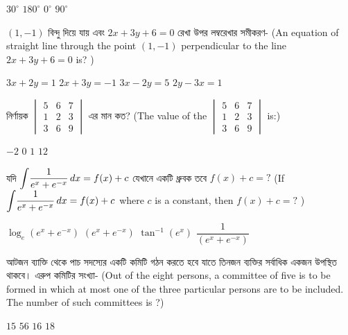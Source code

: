 \documentclass[addpoints]{exam}
\begin{document}
\begin{questions}
\begin{oneparchoices}
\choice  $ 30^{\circ} $
\choice  $ 180^{\circ} $
\choice  $ 0^{\circ} $
\choice  $ 90^{\circ} $
\end{oneparchoices}

\question $ (1,-1) $ বিন্দু দিয়ে যায় এবং $ 2x+3y+6=0 $ রেখা উপর লম্বরেখার সমীকরণ- (An equation of straight line through the point $ (1,-1) $ perpendicular to the line $ 2x+3y+6=0 $ is? )

\begin{oneparchoices}
\choice $ 3x+2y=1 $
\choice $ 2x+3y=-1 $ 
\choice $ 3x-2y=5 $
\choice $ 2y-3x=1 $
\end{oneparchoices}

\question  নির্ণায়ক $ \begin{vmatrix}
5 & 6 & 7\\
1 & 2 & 3\\
3 & 6 & 9
\end{vmatrix} $ এর মান কত? (The value of the $ \begin{vmatrix}
5 & 6 & 7\\
1 & 2 & 3\\
3 & 6 & 9
\end{vmatrix} $ is:)

\begin{oneparchoices}
\choice $ -2 $
\choice $ 0 $
\choice $ 1 $
\choice $ 12 $
\end{oneparchoices}


\question যদি $ \mathlarger{\int}\dfrac{1}{e^{x}+e^{-x}}\, dx =f(x) + c $  যেখানে একটি ধ্রুবক তবে $ f(x)+c = ?$ (If $ \mathlarger{\int}\dfrac{1}{e^{x}+e^{-x}}\, dx =f(x) + c $ where $ c $ is a constant, then $ f(x)+c =? $ )


\begin{oneparchoices}
\choice  $ \log_{e}(e^{x}+e^{-x}) $
\choice  $ (e^{x}+e^{-x}) $
\choice  $ \tan^{-1}(e^{x}) $
\choice  $ \dfrac{1}{(e^{x}+e^{-x})} $
\end{oneparchoices}


\question  আটজন ব্যাক্তি থেকে পাচ সদস্যের একটি কমিটি গঠন করতে হবে যাতে তিনজন ব্যক্তির সর্বাধিক একজন উপস্থিত থাকবে। এরুপ কমিটির সংখ্যা- (Out of the eight persons, a committee of five is to be formed in which at most one of the three particular persons are to be included. The number of such committees is ?)

\begin{oneparchoices}
\choice $ 15 $
\choice $ 56 $
\choice $ 16 $
\choice $ 18 $
\end{oneparchoices}


\end{questions}
\end{document}
